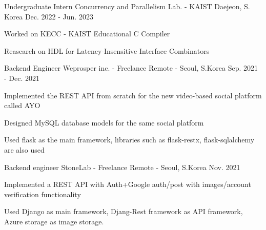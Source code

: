 \vspace{-2mm}


\begin{cventries}

  \cventry
    {Undergraduate Intern}
    {Concurrency and Parallelism Lab. - KAIST}
    {Daejeon, S. Korea}
    {Dec. 2022 - Jun. 2023}
    {
        \begin{cvitems}
            \item {Worked on KECC - KAIST Educational C Compiler}
            \item {Reasearch on HDL for Latency-Insensitive Interface Combinators}
        \end{cvitems}
    }
  \cventry
    {Backend Engineer} %
    {Weprosper inc. - Freelance} %
    {Remote - Seoul, S.Korea} %
    {Sep. 2021 - Dec. 2021} %
    {
      \begin{cvitems} %
        \item {Implemented the REST API from scratch for the new video-based social platform called AYO}
        \item {Designed MySQL database models for the same social platform}
        \item {Used flask as the main framework, libraries such as flask-restx, flask-sqlalchemy are also used}
      \end{cvitems}
    }
  \cventry
    {Backend engineer} %
    {StoneLab - Freelance} %
    {Remote - Seoul, S.Korea} %
    {Nov. 2021} %
    {
      \begin{cvitems} %
        \item {Implemented a REST API with Auth+Google auth/post with images/account verification functionality}
        \item {Used Django as main framework, Djang-Rest framework as API framework, Azure storage as image storage.}
      \end{cvitems}
    }
\end{cventries}
